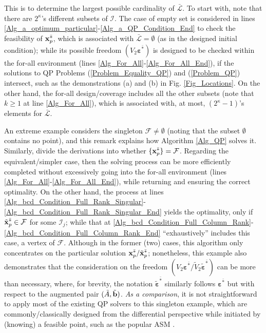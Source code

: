 \documentclass{imaman}
\newcommand{\bfb}{{\bf b}}
\newcommand{\bfx}{{\bf x}}
\newcommand{\bfvarepsilon}{{\boldsymbol \varepsilon}}
\newcommand{\calF}{{\mathcal F}}
\newcommand{\calI}{{\mathcal I}}
\newcommand{\calL}{{\mathcal L}}
\numberwithin{equation}{section}
\begin{document}
\begin{remark}
This is to determine the largest possible cardinality of $\bar\calL$. To start with, note that there are $2^\kappa$'s different subsets of $\calI$. The case of empty set is considered in lines \ref{Alg_a_optimum_particular}-\ref{Alg_a_QP_Condition_End} to check the feasibility of $\bfx_p^{\bar *}$, which is associated with $\bar\calL=\emptyset$ (as in the designed initial condition); while its possible freedom $(V_2\bfvarepsilon^{\bar *})$ is designed to be checked within the for-all environment (lines \ref{Alg_For_All}-\ref{Alg_For_All_End}), if the solutions to QP Problems (\ref{Problem_Equality_QP}) and (\ref{Problem_QP}) intersect, such as the demonstrations (a) and (b) in Fig. \ref{Fig_Locations}. On the other hand, the for-all design/coverage includes all the other subsets (note that $k\ge 1$ at line \ref{Alg_For_All}), which is associated with, at most, $(2^\kappa-1)$'s elements for $\bar\calL$.
\label{Rem_Candidates_Cardinality}
\end{remark}

\begin{remark}
An extreme example considers the singleton $\calF\ne\emptyset$ (noting that the subset $\emptyset$ contains no point), and this remark explains how Algorithm \ref{Alg_QP} solves it. Similarly, divide the derivations into whether $\{\bfx_p^{\bar *}\}=\calF$. Regarding the equivalent/simpler case, then the solving process can be more efficiently completed without excessively going into the for-all environment (lines \ref{Alg_For_All}-\ref{Alg_For_All_End}), while returning and ensuring the correct optimality. On the other hand, the process at lines \ref{Alg_bcd_Condition_Full_Rank_Singular}-\ref{Alg_bcd_Condition_Full_Rank_Singular_End} yields the optimality, only if $\tilde\bfx_p^{\bar *}\in\calF$ for some $\calI_j$; while that at \ref{Alg_bcd_Condition_Full_Column_Rank}-\ref{Alg_bcd_Condition_Full_Column_Rank_End} ``exhaustively'' includes this case, a vertex of $\calF$. Although in the former (two) cases, this algorithm only concentrates on the particular solution $\bfx_p^{\bar *}/\tilde\bfx_p^{\bar *}$; nonetheless, this example also demonstrates that the consideration on the freedom $(V_2\bfvarepsilon^{\bar *}/\tilde V_2\tilde\bfvarepsilon^{\bar *})$ can be more than necessary, where, for brevity, the notation $\tilde\bfvarepsilon^{\bar *}$ similarly follows $\bfvarepsilon^{\bar *}$ but with respect to the augmented pair $(\tilde A,\tilde\bfb)$. \textit{As a comparison}, it is not straightforward to apply most of the existing QP solvers \citep{BoVa:04,NoWr:06} to this singleton example, which are commonly/classically designed from the differential perspective while initiated by (knowing) a feasible point, such as the popular ASM \citep{Lu(Ye):03(16)}.
\label{Rem_QP_Singleton_F}
\end{remark}
\end{document}
